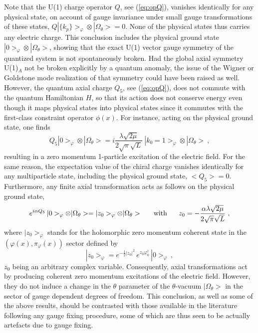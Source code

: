 \documentclass[a4paper,11pt]{article}
\begin{document}
Note that the U(1) charge operator $Q$, see (\ref{eq:opQ}), 
vanishes identically for any physical state, on account of gauge invariance
under small gauge transformations of these states,
$Q|\{k_p\}>_\varphi\otimes|\Omega_\theta>=0$. None of the physical states
thus carries any electric charge. This conclusion includes the
physical ground state $|0>_\varphi\otimes|\Omega_\theta>$, showing
that the exact U(1) vector gauge symmetry of the quantized system
is not spontaneously broken. Had the global axial symmetry U(1)$_A$
not be broken explicitly by a quantum anomaly, the issue of the Wigner or 
Goldstone mode realization of that symmetry could have been raised as well. 
However, the quantum axial charge $Q_5$, see (\ref{eq:opQ}), does not commute
with the quantum Hamiltonian $H$, so that its action does not conserve
energy even though it maps physical states into physical states since
it commutes with the first-class constraint operator $\phi(x)$. For
instance, acting on the physical ground state, one finds
\begin{equation}
Q_5|0>_\varphi\otimes|\Omega_\theta>=
i\frac{\lambda\sqrt{2\mu}}{2\sqrt{\pi}\sqrt{L}}\ 
|k_0=1>_\varphi\otimes|\Omega_\theta>\ ,
\end{equation}
resulting in a zero momentum 1-particle excitation of the electric field. 
For the same reason, the expectation value of the chiral charge vanishes 
identically for any multiparticle state, including the physical 
ground state, $<Q_5>=0$. Furthermore, any finite axial transformation acts as 
follows on the physical ground state,
\begin{equation}
e^{i\alpha Q_5}\,|0>_\varphi\otimes|\Omega_\theta>=
|z_0>_\varphi\otimes|\Omega_\theta>\ \ \ \ \ 
{\rm with}\ \ \ \ \ z_0=-\frac{\alpha\lambda\sqrt{2\mu}}{2\sqrt{\pi}\sqrt{L}}\ ,
\end{equation}
where $|z_0>_\varphi$ stands for the holomorphic zero momentum
coherent state in the $(\varphi(x),\pi_\varphi(x))$ sector defined by
\begin{equation}
|z_0>_\varphi=e^{-\frac{1}{2}|z_0|^2}\,e^{z_0\varphi^\dagger_0}\,|0>_\varphi\ ,
\end{equation}
$z_0$ being an arbitrary complex variable.
Consequently, axial transformations act by producing coherent
zero momentum excitations of the electric field. However, they do not induce
a change in the $\theta$ parameter of the $\theta$-vacuum $|\Omega_\theta>$
in the sector of gauge dependent degrees of freedom.
This conclusion, as well as some of the above results, should be
contrasted with those available in the literature following any
gauge fixing procedure,\cite{SchM1,Manton,Hetrick} some of which are thus 
seen to be actually artefacts due to gauge fixing.
\end{document}
